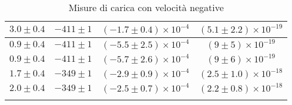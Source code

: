 \begin{longtable}[C]{|c|c|c|c|}
            \hline
            $3.0 \pm 0.4$ & $-411 \pm 1$ & $(-1.7 \pm 0.4) \times 10^{-4}$ & $(5.1 \pm 2.2) \times 10^{-19}$ \\
            \hline
            $0.9 \pm 0.4$ & $-411 \pm 1$ & $(-5.5 \pm 2.5) \times 10^{-4}$ & $(9 \pm 5) \times 10^{-19}$ \\
            \hline
            $0.9 \pm 0.4$ & $-411 \pm 1$ & $(-5.7 \pm 2.6) \times 10^{-4}$ & $(9 \pm 6) \times 10^{-19}$ \\
            \hline
            $1.7 \pm 0.4$ & $-349 \pm 1$ & $(-2.9 \pm 0.9) \times 10^{-4}$ & $(2.5 \pm 1.0) \times 10^{-18}$ \\
            \hline
            $2.0 \pm 0.4$ & $-349 \pm 1$ & $(-2.5 \pm 0.7) \times 10^{-4}$ & $(2.2 \pm 0.8) \times 10^{-18}$ \\
            \hline
            \caption{Misure di carica con velocità negative}
        \end{longtable}

